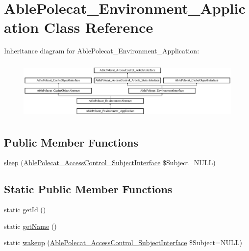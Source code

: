 \hypertarget{class_able_polecat___environment___application}{}\section{Able\+Polecat\+\_\+\+Environment\+\_\+\+Application Class Reference}
\label{class_able_polecat___environment___application}
Inheritance diagram for Able\+Polecat\+\_\+\+Environment\+\_\+\+Application\+:\begin{figure}[H]
\begin{center}
\leavevmode
\includegraphics[height=3.010753cm]{class_able_polecat___environment___application}
\end{center}
\end{figure}
\subsection*{Public Member Functions}
\begin{DoxyCompactItemize}
\item 
\hyperlink{class_able_polecat___environment___application_a365e24d7b066205cafa2a5cce3a4f224}{sleep} (\hyperlink{interface_able_polecat___access_control___subject_interface}{Able\+Polecat\+\_\+\+Access\+Control\+\_\+\+Subject\+Interface} \$Subject=N\+U\+L\+L)
\end{DoxyCompactItemize}
\subsection*{Static Public Member Functions}
\begin{DoxyCompactItemize}
\item 
static \hyperlink{class_able_polecat___environment___application_acfaa3a96d0cb5a4c0d4d710dcba41e9e}{get\+Id} ()
\item 
static \hyperlink{class_able_polecat___environment___application_a4ef9bd37ba3ce8a13c1e8bcf4f72a630}{get\+Name} ()
\item 
static \hyperlink{class_able_polecat___environment___application_a3f2135f6ad45f51d075657f6d20db2cd}{wakeup} (\hyperlink{interface_able_polecat___access_control___subject_interface}{Able\+Polecat\+\_\+\+Access\+Control\+\_\+\+Subject\+Interface} \$Subject=N\+U\+L\+L)
\end{DoxyCompactItemize}
